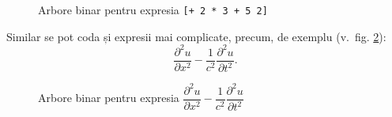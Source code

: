 \begin{figure}[!htbp]
    \centering
    \caption{Arbore binar pentru expresia \texttt{[+ 2 * 3 + 5 2]}}
    \label{fig:mat-polish1}
\end{figure}

Similar se pot coda și expresii mai complicate, precum, de exemplu (v.\ fig. \ref{fig:arbore-pder}):
\[
    \frac{\partial^2 u}{\partial x^2} - \dfrac{1}{c^2} \frac{\partial^2 u}{\partial t^2}.
\]


\begin{figure}[!htbp]
    \centering
    \begin{tikzpicture}[
        every node/.style = {minimum width = 2em, draw, circle},
        ]

    \end{tikzpicture}
    \caption{Arbore binar pentru expresia %
    $ \dfrac{\partial^2 u}{\partial x^2} - \dfrac{1}{c^2} \dfrac{\partial^2 u}{\partial t^2}$}
    \label{fig:arbore-pder}
\end{figure}
